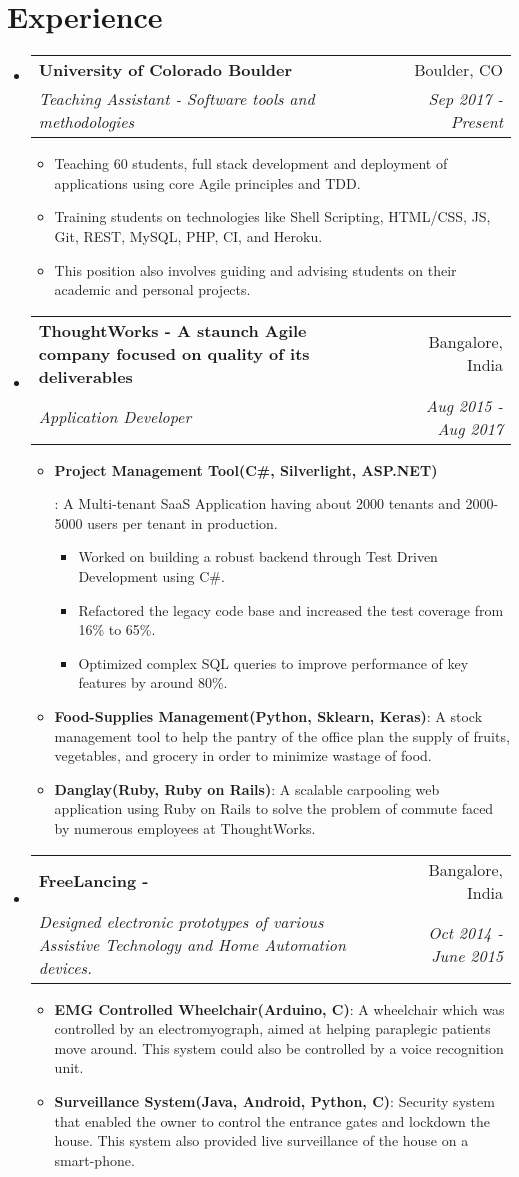 \documentclass[letterpaper,11pt]{article}
\makeatletter
\newcommand{\resumeItem}[2]{
  \item\small{
    \textbf{#1}{: #2 \vspace{-2pt}}
  }
}
\newcommand{\resumeItemWithMoreVSpace}[2]{
  \item\small{
    \textbf{#1}{: #2 \vspace{-0.5pt}}
  }
}
\newcommand{\resumePoint}[1]{
  \item\small{#1}
}
\newcommand{\resumeSubheading}[4]{
  \vspace{-1pt}\item
    \begin{tabular*}{0.97\textwidth}{l@{\extracolsep{\fill}}r}
      \textbf{#1} & #2 \\
      \textit{\small#3} & \textit{\small #4} \\
    \end{tabular*}\vspace{-2pt}
}
\newcommand{\resumeSubHeadingListStart}{\begin{itemize}[leftmargin=*]}
\newcommand{\resumeSubHeadingListEnd}{\end{itemize}\vspace{-10pt}}
\newcommand{\resumeItemListStart}{\begin{itemize}\vspace{-4pt}}
\newcommand{\resumeItemListEnd}{\end{itemize}\vspace{-5pt}}
\newcommand{\resumeInnerItemListStart}{\begin{itemize}\vspace{-1pt}}
\newcommand{\resumeInnerItemListEnd}{\end{itemize}\vspace{0pt}}
\makeatother
\begin{document}

\section{Experience}
  \resumeSubHeadingListStart
    \resumeSubheading
      {University of Colorado Boulder}{Boulder, CO}
      {Teaching Assistant - Software tools and methodologies}{Sep 2017 - Present}
      \resumeItemListStart
          \resumePoint{Teaching 60 students, full stack development and deployment of applications using core Agile principles and TDD.
          }
          \resumePoint{Training students on technologies like Shell Scripting, HTML/CSS, JS, Git, REST, MySQL, PHP, CI, and Heroku.
          }
          \resumePoint{This position also involves guiding and advising students on their academic and personal projects.
          }
      \resumeItemListEnd
    \resumeSubheading
      {ThoughtWorks - \normalfont A staunch Agile company focused on quality of its deliverables}{Bangalore, India}
      {Application Developer}{Aug 2015 - Aug 2017}
      \resumeItemListStart
        \resumeItem {Project Management Tool(C\#, Silverlight, ASP.NET)}
          {A Multi-tenant SaaS Application having about 2000 tenants and 2000-5000 users per tenant in production.
          \resumeInnerItemListStart
            \resumePoint {Worked on building a robust backend through Test Driven Development using C\#.}
            \resumePoint {Refactored the legacy code base and increased the test coverage from 16\% to 65\%.}
            \resumePoint {Optimized complex SQL queries to improve performance of key features by around 80\%.}
          \resumeInnerItemListEnd}
        \resumeItemWithMoreVSpace {Food-Supplies Management(Python, Sklearn, Keras)}{A stock management tool to help the pantry of the office plan the supply of fruits, vegetables, and grocery in order to minimize wastage of food.}
        \resumeItem{Danglay(Ruby, Ruby on Rails)}{A scalable carpooling web application using Ruby on Rails to solve the problem of commute faced by numerous employees at ThoughtWorks.}
      \resumeItemListEnd
    \resumeSubheading
      {FreeLancing - \normalfont{Embedded System Prototyping}}{Bangalore, India}
      {Designed electronic prototypes of various Assistive Technology and Home Automation devices.}{Oct 2014 - June 2015}
      \resumeItemListStart
          \resumeItem{EMG Controlled Wheelchair(Arduino, C)}{A wheelchair which was controlled by an electromyograph, aimed at helping paraplegic patients move around. This system could also be controlled by a voice recognition unit.}
          \resumeItem{Surveillance System(Java, Android, Python, C)}{Security system that enabled the owner to control the entrance gates and lockdown the house. This system also provided live surveillance of the house on a smart-phone.}
      \resumeItemListEnd
  \resumeSubHeadingListEnd
\end{document}

